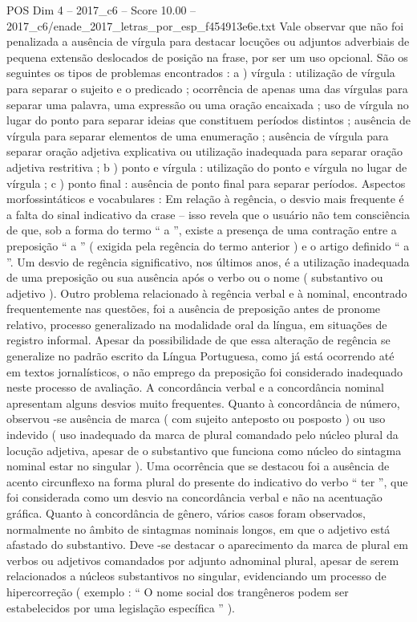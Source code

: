 \begin{textsample}{POS Dim 4 – 2017\_c6 – Score 10.00 – 2017\_c6/enade\_2017\_letras\_por\_esp\_f454913e6e.txt}
Vale observar que não foi penalizada a ausência de vírgula para destacar locuções ou adjuntos adverbiais de pequena extensão deslocados de posição na frase, por ser um uso opcional.
São os seguintes os tipos de problemas encontrados : a ) vírgula : utilização de vírgula para separar o sujeito e o predicado ; ocorrência de apenas uma das vírgulas para separar uma palavra, uma expressão ou uma oração encaixada ; uso de vírgula no lugar do ponto para separar ideias que constituem períodos distintos ; ausência de vírgula para separar elementos de uma enumeração ; ausência de vírgula para separar oração adjetiva explicativa ou utilização inadequada para separar oração adjetiva restritiva ; b ) ponto e vírgula : utilização do ponto e vírgula no lugar de vírgula ; c ) ponto final : ausência de ponto final para separar períodos.
Aspectos morfossintáticos e vocabulares : Em relação à regência, o desvio mais frequente é a falta do sinal indicativo da crase – isso revela que o usuário não tem consciência de que, sob a forma do termo “ a ”, existe a presença de uma contração entre a preposição “ a ” ( exigida pela regência do termo anterior ) e o artigo definido “ a ”.
Um desvio de regência significativo, nos últimos anos, é a utilização inadequada de uma preposição ou sua ausência após o verbo ou o nome ( substantivo ou adjetivo ).
Outro problema relacionado à regência verbal e à nominal, encontrado frequentemente nas questões, foi a ausência de preposição antes de pronome relativo, processo generalizado na modalidade oral da língua, em situações de registro informal.
Apesar da possibilidade de que essa alteração de regência se generalize no padrão escrito da Língua Portuguesa, como já está ocorrendo até em textos jornalísticos, o não emprego da preposição foi considerado inadequado neste processo de avaliação.
A concordância verbal e a concordância nominal apresentam alguns desvios muito frequentes.
Quanto à concordância de número, observou -se ausência de marca ( com sujeito anteposto ou posposto ) ou uso indevido ( uso inadequado da marca de plural comandado pelo núcleo plural da locução adjetiva, apesar de o substantivo que funciona como núcleo do sintagma nominal estar no singular ).
Uma ocorrência que se destacou foi a ausência de acento circunflexo na forma plural do presente do indicativo do verbo “ ter ”, que foi considerada como um desvio na concordância verbal e não na acentuação gráfica.
Quanto à concordância de gênero, vários casos foram observados, normalmente no âmbito de sintagmas nominais longos, em que o adjetivo está afastado do substantivo.
Deve -se destacar o aparecimento da marca de plural em verbos ou adjetivos comandados por adjunto adnominal plural, apesar de serem relacionados a núcleos substantivos no singular, evidenciando um processo de hipercorreção ( exemplo : “ O nome social dos trangêneros podem ser estabelecidos por uma legislação específica ” ).

\end{textsample}
